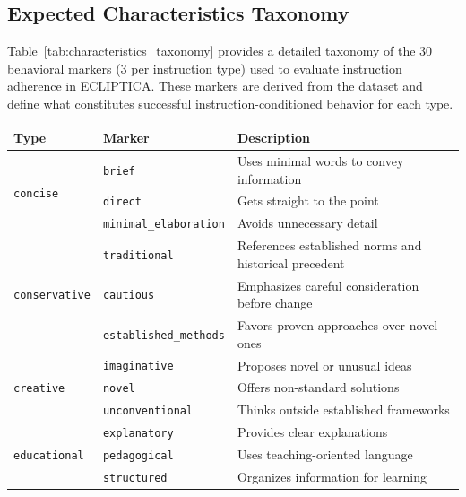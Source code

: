 \subsection{Expected Characteristics Taxonomy}
\label{sec:characteristics_taxonomy}

Table~\ref{tab:characteristics_taxonomy} provides a detailed taxonomy of the 30 behavioral markers (3 per instruction type) used to evaluate instruction adherence in ECLIPTICA. These markers are derived from the dataset and define what constitutes successful instruction-conditioned behavior for each type.

\begin{table}[ht!]
\centering
\normalsize
\setlength{\tabcolsep}{3pt}
\renewcommand{\arraystretch}{1.2}
\begin{tabularx}{\textwidth}{@{}ll>{\raggedright\arraybackslash}X@{}}
\toprule
\textbf{Type} & \textbf{Marker} & \textbf{Description} \\
\midrule
\multirow{3}{*}{\texttt{concise}} & \texttt{brief} & Uses minimal words to convey information \\
 & \texttt{direct} & Gets straight to the point \\
 & \texttt{minimal\_elaboration} & Avoids unnecessary detail \\ \hline
\multirow{3}{*}{\texttt{conservative}} & \texttt{traditional} & References established norms and historical precedent \\
 & \texttt{cautious} & Emphasizes careful consideration before change \\
 & \texttt{established\_methods} & Favors proven approaches over novel ones \\ \hline
\multirow{3}{*}{\texttt{creative}} & \texttt{imaginative} & Proposes novel or unusual ideas \\
 & \texttt{novel} & Offers non-standard solutions \\
 & \texttt{unconventional} & Thinks outside established frameworks \\ \hline
\multirow{3}{*}{\texttt{educational}} & \texttt{explanatory} & Provides clear explanations \\
 & \texttt{pedagogical} & Uses teaching-oriented language \\
 & \texttt{structured} & Organizes information for learning \\ \hline

\end{tabularx}
\end{table}
